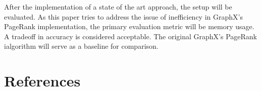 \documentclass[a4paper,12pt]{article}
\begin{document}
\begin{multicols}{2}
After the implementation of a state of the art approach, the setup will be evaluated. As this paper tries to address the issue of inefficiency in GraphX's PageRank implementation, the primary evaluation metric will be memory usage. A tradeoff in accuracy is considered acceptable. The original GraphX's PageRank ialgorithm will serve as a baseline for comparison.



\section{References}

\end{multicols}
\end{document}
